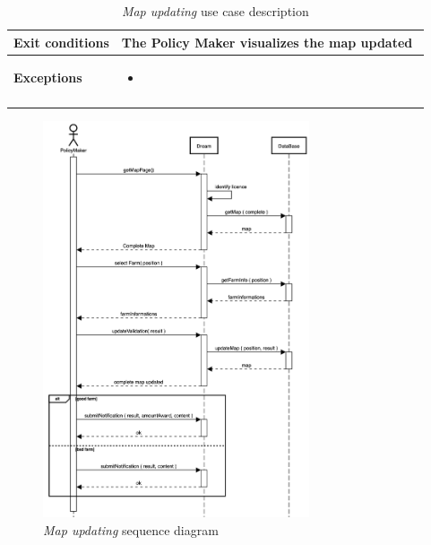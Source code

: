 \begin{enumerate}
\begin{longtable}{p{0.26\linewidth}p{0.75\linewidth}}
        \midrule
        \textbf{Exit conditions} & The Policy Maker visualizes the map updated\\
        \midrule
        \textbf{Exceptions} & 
        \begin{itemize}
            \item 
        \end{itemize}\\
        \bottomrule
        \caption{\emph{Map updating} use case description}
    \end{longtable}
    \begin{figure}[H]
        \begin{center}
        \includegraphics[width=0.7\textwidth]{sequence/updateMap.png}
        \caption{\emph{Map updating} sequence diagram}
        \label{fig:state9}
        \end{center}
    \end{figure}


\end{enumerate}
